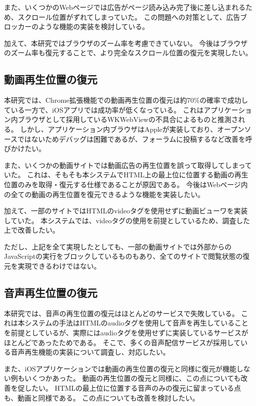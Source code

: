 また、いくつかのWebページでは広告がページ読み込み完了後に差し込まれるため、スクロール位置がずれてしまっていた。
この問題への対策として、広告ブロッカーのような機能の実装を検討している。

加えて、本研究ではブラウザのズーム率を考慮できていない。
今後はブラウザのズーム率も復元することで、より完全なスクロール位置の復元を実現したい。

\subsection{動画再生位置の復元}
本研究では、Chrome拡張機能での動画再生位置の復元は約70\%の確率で成功している一方で、iOSアプリでは成功率が低くなっている。
これはアプリケーション内ブラウザとして採用しているWKWebViewの不具合によるものと推測される。
しかし、アプリケーション内ブラウザはAppleが実装しており、オープンソースではないためデバッグは困難であるが、フォーラムに投稿するなど改善を呼びかけたい。

また、いくつかの動画サイトでは動画広告の再生位置を誤って取得してしまっていた。
これは、そもそも本システムでHTML上の最上位に位置する動画の再生位置のみを取得・復元する仕様であることが原因である。
今後はWebページ内の全ての動画の再生位置を復元できるような機能を実装したい。

加えて、一部のサイトではHTMLのvideoタグを使用せずに動画ビューワを実装していた。
本システムでは、videoタグの使用を前提としているため、調査した上で改善したい。

ただし、上記を全て実現したとしても、一部の動画サイトでは外部からのJavaScriptの実行をブロックしているものもあり、全てのサイトで閲覧状態の復元を実現できるわけではない。

\subsection{音声再生位置の復元}
本研究では、音声の再生位置の復元はほとんどのサービスで失敗している。
これは本システムの手法はHTMLのaudioタグを使用して音声を再生していることを前提としているが、実際にはaudioタグを使用せずに実装しているサービスがほとんどであったためである。
そこで、多くの音声配信サービスが採用している音声再生機能の実装について調査し、対応したい。

また、iOSアプリケーションでは動画の再生位置の復元と同様に復元が機能しない例もいくつかあった。
動画の再生位置の復元と同様に、この点についても改善を促したい。
HTMLの最上位に位置する音声のみの復元に留まっている点も、動画と同様である。
この点についても改善を検討したい。

